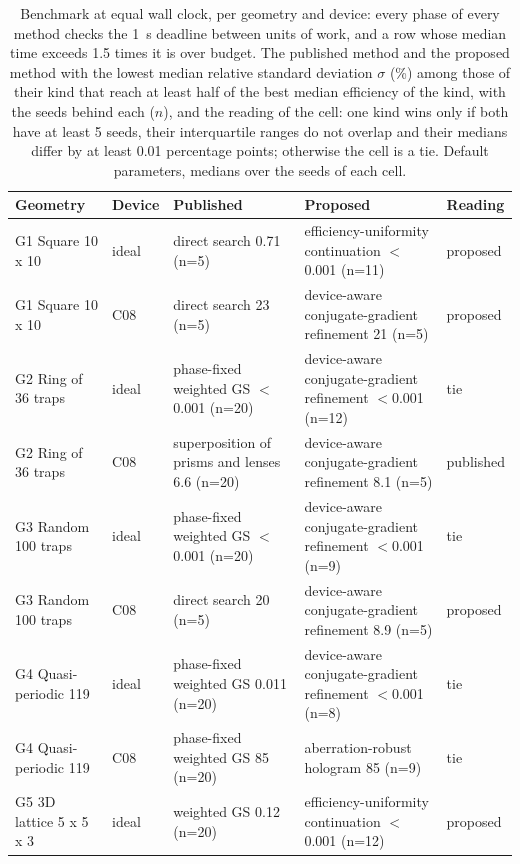 \begin{table}[t]\centering\footnotesize
\caption{Benchmark at equal wall clock, per geometry and device: every phase of every method checks the 1~s deadline between units of work, and a row whose median time exceeds 1.5 times it is over budget. The published method and the proposed method with the lowest median relative standard deviation $\sigma$ (\%) among those of their kind that reach at least half of the best median efficiency of the kind, with the seeds behind each ($n$), and the reading of the cell: one kind wins only if both have at least 5 seeds, their interquartile ranges do not overlap and their medians differ by at least 0.01 percentage points; otherwise the cell is a tie. Default parameters, medians over the seeds of each cell.}\label{tab:benchmark}
\begin{tabular}{@{}>{\raggedright\arraybackslash}p{} l >{\raggedright\arraybackslash}p{} >{\raggedright\arraybackslash}p{} l@{}}\toprule Geometry & Device & Published & Proposed & Reading\\\midrule
G1 Square 10 x 10 & ideal & direct search 0.71 (n=5) & efficiency-uniformity continuation $<$0.001 (n=11) & proposed\\
G1 Square 10 x 10 & C08 & direct search 23 (n=5) & device-aware conjugate-gradient refinement 21 (n=5) & proposed\\
G2 Ring of 36 traps & ideal & phase-fixed weighted GS $<$0.001 (n=20) & device-aware conjugate-gradient refinement $<$0.001 (n=12) & tie\\
G2 Ring of 36 traps & C08 & superposition of prisms and lenses 6.6 (n=20) & device-aware conjugate-gradient refinement 8.1 (n=5) & published\\
G3 Random 100 traps & ideal & phase-fixed weighted GS $<$0.001 (n=20) & device-aware conjugate-gradient refinement $<$0.001 (n=9) & tie\\
G3 Random 100 traps & C08 & direct search 20 (n=5) & device-aware conjugate-gradient refinement 8.9 (n=5) & proposed\\
G4 Quasi-periodic 119 & ideal & phase-fixed weighted GS 0.011 (n=20) & device-aware conjugate-gradient refinement $<$0.001 (n=8) & tie\\
G4 Quasi-periodic 119 & C08 & phase-fixed weighted GS 85 (n=20) & aberration-robust hologram 85 (n=9) & tie\\
G5 3D lattice 5 x 5 x 3 & ideal & weighted GS 0.12 (n=20) & efficiency-uniformity continuation $<$0.001 (n=12) & proposed\\

\end{tabular}
\end{table}
